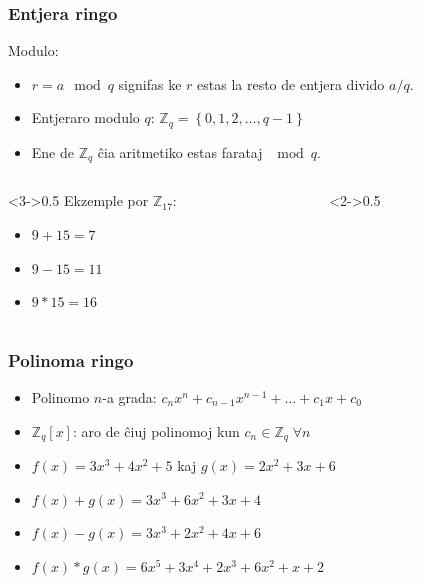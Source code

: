 \documentclass[utf8, aspectratio=169]{beamer}
\begin{document}
\begin{frame}
  \frametitle{Entjera ringo}

  Modulo:
  \begin{itemize}
  \item $r = a \mod q$ signifas ke $r$ estas la resto de entjera divido $a/q$.
  \item Entjeraro modulo $q$: $\mathbb{Z}_q = \left\{0, 1, 2, \ldots, q-1\right\}$
  \item Ene de $\mathbb{Z}_q$ ĉia aritmetiko estas farataj $\mod q$.
  \end{itemize}
  \begin{columns}
    \begin{column}<3->{0.5\textwidth}
      Ekzemple por $\mathbb{Z}_{17}$:
      \begin{itemize}
      \item $9 + 15 = 7$
      \item $9 - 15 = 11$
      \item $9 * 15 = 16$
      \end{itemize}
    \end{column}
    \begin{column}<2->{0.5\textwidth}
    \end{column}
  \end{columns}
\end{frame}

\begin{frame}
  \frametitle{Polinoma ringo}
  \begin{itemize}
  \item Polinomo $n$-a grada: $c_nx^n + c_{n-1}x^{n-1} + \ldots + c_1 x + c_0$
  \item $\mathbb{Z}_q[x]$: aro de ĉiuj polinomoj kun $c_n \in \mathbb{Z}_q
    \;\forall n$

  \end{itemize}

  \vspace{2em}
  \begin{itemize}
  \item<3-> $f(x) = 3x^3 + 4x^2 + 5$ kaj $g(x) = 2x^2 + 3x + 6$
  \item<4-> $f(x) + g(x) = 3x^3 + 6x^2 + 3x + 4$
  \item<5-> $f(x) - g(x) = 3x^3 + 2x^2 + 4x + 6$
  \item<6-> $f(x) * g(x) = 6x^5 + 3x^4 + 2x^3 + 6x^2 + x + 2$
  \end{itemize}

\end{frame}
\end{document}
